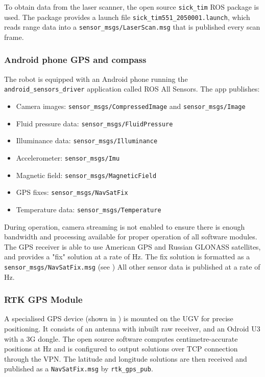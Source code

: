 \documentclass[titlepage,12pt,a4paper]{article}
\begin{document}
To obtain data from the laser scanner, the open source \verb|sick_tim| ROS package is used. The package provides a launch file \verb|sick_tim551_2050001.launch|, which reads range data into a \verb|sensor_msgs/LaserScan.msg| that is published every scan frame.

\subsubsection{Android phone GPS and compass}

The robot is equipped with an Android phone running the \verb|android_sensors_driver| application called ROS All Sensors. The app publishes:

\begin{itemize}
	\item Camera images: \verb|sensor_msgs/CompressedImage| and \verb|sensor_msgs/Image|
	\item Fluid pressure data: \verb|sensor_msgs/FluidPressure|
	\item Illuminance data: \verb|sensor_msgs/Illuminance|
	\item Accelerometer: \verb|sensor_msgs/Imu|
	\item Magnetic field: \verb|sensor_msgs/MagneticField|
	\item GPS fixes: \verb|sensor_msgs/NavSatFix|
	\item Temperature data: \verb|sensor_msgs/Temperature| \\
\end{itemize}

During operation, camera streaming is not enabled to ensure there is enough bandwidth and processing available for proper operation of all software modules. The GPS receiver is able to use American GPS and Russian GLONASS satellites, and provides a "fix" solution at a rate of \unit[1]{Hz}. The fix solution is formatted as a \verb|sensor_msgs/NavSatFix.msg| (see ) All other sensor data is published at a rate of \unit[20]{Hz}.

\subsubsection{RTK GPS Module}

A specialised GPS device (shown in ) is mounted on the UGV for precise positioning. It consists of an antenna with inbuilt raw receiver, and an Odroid U3 with a 3G dongle. The open source software computes centimetre-accurate positions at \unit[2]{Hz} and is configured to output solutions over TCP connection through the VPN. The latitude and longitude solutions are then received and published as a \verb|NavSatFix.msg| by \verb|rtk_gps_pub|.
\end{document}
